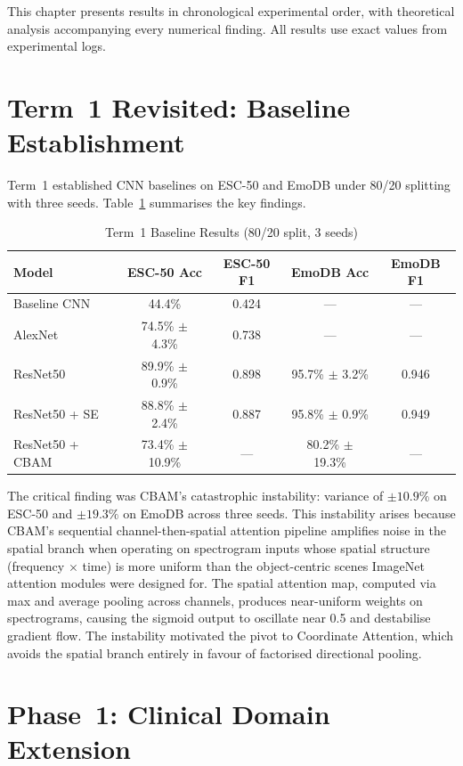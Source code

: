 \documentclass[oneside,openany]{final_report}
\begin{document}
This chapter presents results in chronological experimental order, with theoretical analysis accompanying every numerical finding. All results use exact values from experimental logs.

\section{Term~1 Revisited: Baseline Establishment}

Term~1 established CNN baselines on ESC-50 and EmoDB under 80/20 splitting with three seeds. Table~\ref{tab:term1} summarises the key findings.

\begin{table}[H]
\centering
\caption{Term~1 Baseline Results (80/20 split, 3 seeds)}
\label{tab:term1}
\begin{tabular}{l c c c c}
\toprule
\textbf{Model} & \textbf{ESC-50 Acc} & \textbf{ESC-50 F1} & \textbf{EmoDB Acc} & \textbf{EmoDB F1} \\
\midrule
Baseline CNN & 44.4\% & 0.424 & --- & --- \\
AlexNet & 74.5\% $\pm$ 4.3\% & 0.738 & --- & --- \\
ResNet50 & 89.9\% $\pm$ 0.9\% & 0.898 & 95.7\% $\pm$ 3.2\% & 0.946 \\
ResNet50 + SE & 88.8\% $\pm$ 2.4\% & 0.887 & 95.8\% $\pm$ 0.9\% & 0.949 \\
ResNet50 + CBAM & 73.4\% $\pm$ 10.9\% & --- & 80.2\% $\pm$ 19.3\% & --- \\
\bottomrule
\end{tabular}
\end{table}

The critical finding was CBAM's catastrophic instability: variance of $\pm 10.9\%$ on ESC-50 and $\pm 19.3\%$ on EmoDB across three seeds. This instability arises because CBAM's sequential channel-then-spatial attention pipeline amplifies noise in the spatial branch when operating on spectrogram inputs whose spatial structure (frequency $\times$ time) is more uniform than the object-centric scenes ImageNet attention modules were designed for. The spatial attention map, computed via max and average pooling across channels, produces near-uniform weights on spectrograms, causing the sigmoid output to oscillate near 0.5 and destabilise gradient flow. The instability motivated the pivot to Coordinate Attention, which avoids the spatial branch entirely in favour of factorised directional pooling.

\section{Phase~1: Clinical Domain Extension}
\end{document}
